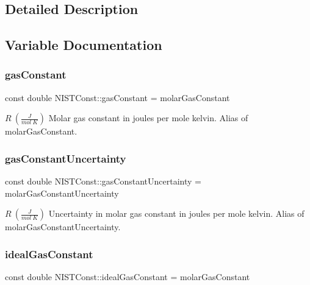 \subsection{Detailed Description}


\subsection{Variable Documentation}
\mbox{\label{group___molar_gas_constant_ga8a80485a1bf8e9acded5ddd69a05084f}} 
\subsubsection{\texorpdfstring{gas\+Constant}{gasConstant}}
{\footnotesize\ttfamily const double N\+I\+S\+T\+Const\+::gas\+Constant = molar\+Gas\+Constant}

$R \ (\frac{J}{mol\ K})$ Molar gas constant in joules per mole kelvin. Alias of molar\+Gas\+Constant. \mbox{\label{group___molar_gas_constant_ga6edc72c9e9c859883be07279558df1de}} 
\subsubsection{\texorpdfstring{gas\+Constant\+Uncertainty}{gasConstantUncertainty}}
{\footnotesize\ttfamily const double N\+I\+S\+T\+Const\+::gas\+Constant\+Uncertainty = molar\+Gas\+Constant\+Uncertainty}

$R \ (\frac{J}{mol\ K})$ Uncertainty in molar gas constant in joules per mole kelvin. Alias of molar\+Gas\+Constant\+Uncertainty. \mbox{\label{group___molar_gas_constant_ga0315ba6edc63c93914224443ef8a6e17}} 
\subsubsection{\texorpdfstring{ideal\+Gas\+Constant}{idealGasConstant}}
{\footnotesize\ttfamily const double N\+I\+S\+T\+Const\+::ideal\+Gas\+Constant = molar\+Gas\+Constant}

